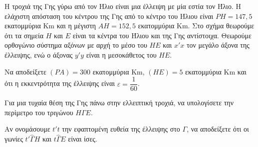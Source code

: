 \begin{figure}
\end{figure}
Η τροχιά της Γης γύρω από τον Ήλιο είναι μια έλλειψη με μία εστία τον Ήλιο. Η ελάχιστη απόσταση του κέντρου της Γης από το κέντρο του Ήλιου είναι $PH = 147,5$ εκατομμύρια Km και η μέγιστη $AH = 152,5$ εκατομμύρια Km. Στο σχήμα θεωρούμε ότι τα σημεία $H$ και $E$ είναι τα κέντρα του Ήλιου και της Γης αντίστοιχα. Θεωρούμε ορθογώνιο σύστημα αξόνων με αρχή το μέσο του $HE$ και $x'x$ τον μεγάλο άξονα της έλλειψης, ενώ ο άξονας $y'y$ είναι η μεσοκάθετος του $HE$.

\begin{alist}
\item Να αποδείξετε $(PA) = 300$ εκατομμύρια Km, $(HE) = 5$ εκατομμύρια Km και ότι η εκκεντρότητα της έλλειψης είναι $\varepsilon = \dfrac{1}{60}$. 
\item Για μια τυχαία θέση της Γης πάνω στην ελλειπτική τροχιά, να υπολογίσετε την περίμετρο του τριγώνου $H\Gamma E$. 
\item Αν ονομάσουμε $t't$ την εφαπτομένη ευθεία της έλλειψης στο $\Gamma$, να αποδείξετε ότι οι γωνίες $t'\hat{\Gamma}H$ και $t\hat{\Gamma}E$ είναι ίσες. 
\end{alist}